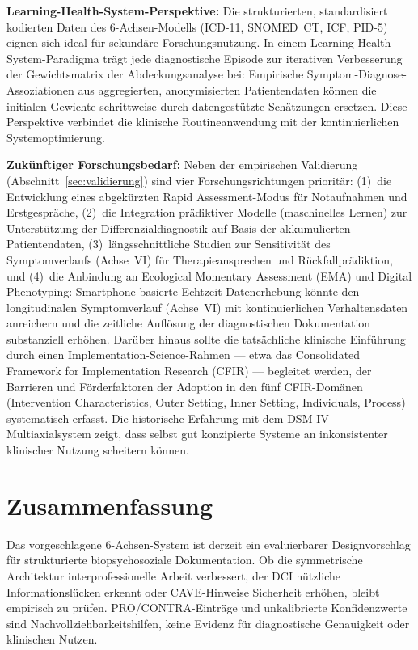 \documentclass[11pt,a4paper]{article}
\begin{document}
\textbf{Learning-Health-System-Perspektive:} Die strukturierten, standardisiert kodierten Daten des 6-Achsen-Modells (ICD-11, SNOMED~CT, ICF, PID-5) eignen sich ideal f\"ur sekund\"are Forschungsnutzung. In einem Learning-Health-System-Paradigma tr\"agt jede diagnostische Episode zur iterativen Verbesserung der Gewichtsmatrix der Abdeckungsanalyse bei: Empirische Symptom-Diagnose-Assoziationen aus aggregierten, anonymisierten Patientendaten k\"onnen die initialen Gewichte schrittweise durch datengest\"utzte Sch\"atzungen ersetzen. Diese Perspektive verbindet die klinische Routineanwendung mit der kontinuierlichen Systemoptimierung.

\textbf{Zuk\"unftiger Forschungsbedarf:} Neben der empirischen Validierung (Abschnitt~\ref{sec:validierung}) sind vier Forschungsrichtungen priorit\"ar: (1)~die Entwicklung eines abgek\"urzten \glqq Rapid Assessment\grqq{}-Modus f\"ur Notaufnahmen und Erstgespr\"ache, (2)~die Integration pr\"adiktiver Modelle (maschinelles Lernen) zur Unterst\"utzung der Differenzialdiagnostik auf Basis der akkumulierten Patientendaten, (3)~l\"angsschnittliche Studien zur Sensitivit\"at des Symptomverlaufs (Achse~VI) f\"ur Therapieansprechen und R\"uckfallpr\"adiktion, und (4)~die Anbindung an Ecological Momentary Assessment (EMA) und Digital Phenotyping: Smartphone-basierte Echtzeit-Datenerhebung k\"onnte den longitudinalen Symptomverlauf (Achse~VI) mit kontinuierlichen Verhaltensdaten anreichern und die zeitliche Aufl\"osung der diagnostischen Dokumentation substanziell erh\"ohen. Dar\"uber hinaus sollte die tats\"achliche klinische Einf\"uhrung durch einen Implementation-Science-Rahmen --- etwa das Consolidated Framework for Implementation Research (CFIR) --- begleitet werden, der Barrieren und F\"orderfaktoren der Adoption in den f\"unf CFIR-Dom\"anen (Intervention Characteristics, Outer Setting, Inner Setting, Individuals, Process) systematisch erfasst. Die historische Erfahrung mit dem DSM-IV-Multiaxialsystem zeigt, dass selbst gut konzipierte Systeme an inkonsistenter klinischer Nutzung scheitern k\"onnen.


\section{Zusammenfassung}
\label{sec:zusammenfassung}

Das vorgeschlagene 6-Achsen-System ist derzeit ein evaluierbarer Designvorschlag f\"ur strukturierte biopsychosoziale Dokumentation. Ob die symmetrische Architektur interprofessionelle Arbeit verbessert, der DCI n\"utzliche Informationsl\"ucken erkennt oder CAVE-Hinweise Sicherheit erh\"ohen, bleibt empirisch zu pr\"ufen. PRO/CONTRA-Eintr\"age und unkalibrierte Konfidenzwerte sind Nachvollziehbarkeitshilfen, keine Evidenz f\"ur diagnostische Genauigkeit oder klinischen Nutzen.
\end{document}

